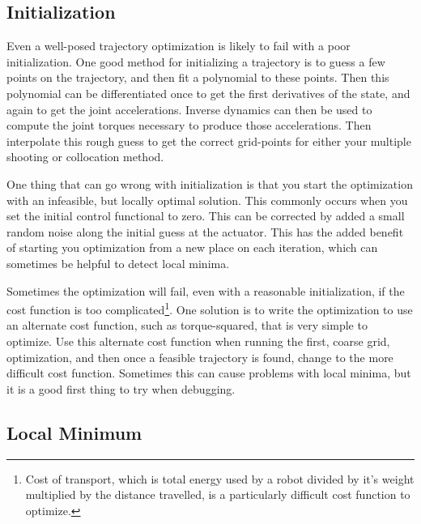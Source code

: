 \subsection{Initialization}

Even a well-posed trajectory optimization is likely to fail with a poor initialization. One good method for initializing a trajectory is to guess a few points on the trajectory, and then fit a polynomial to these points. Then this polynomial can be differentiated once to get the first derivatives of the state, and again to get the joint accelerations. Inverse dynamics can then be used to compute the joint torques necessary to produce those accelerations. Then interpolate this rough guess to get the correct grid-points for either your multiple shooting or collocation method.

\par One thing that can go wrong with initialization is that you start the optimization with an infeasible, but locally optimal solution. This commonly occurs when you set the initial control functional to zero. This can be corrected by added a small random noise along the initial guess at the actuator. This has the added benefit of starting you optimization from a new place on each iteration, which can sometimes be helpful to detect local minima.

\par Sometimes the optimization will fail, even with a reasonable initialization, if the cost function is too complicated\footnote{Cost of transport, which is total energy used by a robot divided by it's weight multiplied by the distance travelled, is a particularly difficult cost function to optimize.}. One solution is to write the optimization to use an alternate cost function, such as torque-squared, that is very simple to optimize. Use this alternate cost function when running the first, coarse grid, optimization, and then once a feasible trajectory is found, change to the more difficult cost function. Sometimes this can cause problems with local minima, but it is a good first thing to try when debugging.

\subsection{Local Minimum}

